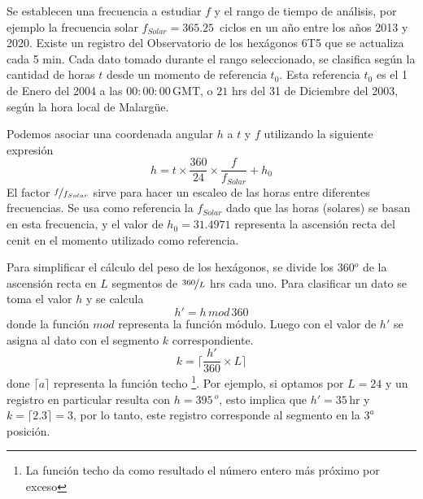         Se establecen una frecuencia a estudiar $f$ y el rango de tiempo de análisis, por ejemplo la frecuencia solar $f_{Solar}= 365.25\,$ ciclos en un año entre los años 2013 y 2020. Existe un registro del Observatorio de los hexágonos 6T5 que se actualiza cada 5 min. Cada dato tomado durante el rango seleccionado, se clasifica según la cantidad de horas $t$ desde un momento de referencia $t_0$. Esta referencia $t_0$ es el 1 de Enero del 2004 a las $00:00:00\,$GMT, o  $21$ hrs del 31 de Diciembre del 2003, según la hora local de Malargüe.

        Podemos asociar una coordenada angular $h$   a $t$  y $f$  utilizando la siguiente expresión
         \begin{equation}
          h = t \times \frac{360}{24} \times\frac{f}{f_{Solar}} + h_0
          \label{eq:h_horas} 
        \end{equation}
        El factor $\nicefrac{f}{f_{Solar}}$ sirve para hacer un escaleo de las horas entre diferentes frecuencias. Se usa como referencia la $f_{Solar}$ dado que las horas (solares) se basan en esta frecuencia, y el valor de $h_0=31.4971$ representa la ascensión recta del cenit en el momento utilizado como referencia.
        
        Para simplificar el cálculo del peso de los hexágonos, se divide los 360$^o$ de la ascensión recta en $L$ segmentos de $\nicefrac{360}{L}$ hrs cada uno. Para clasificar un dato se  toma  el valor $h$  y se calcula
        \begin{equation}
          h' = h\, mod \,360 
          \label{eq:h_primado}
        \end{equation}
        donde la función $mod$ representa la función módulo. Luego con el valor de $h'$ se asigna al dato con el segmento $k$ correspondiente.
        \begin{equation}
          k = \bigg \lceil \frac{h'}{360}\times L \bigg \rceil
        \end{equation}
        done $\lceil a \rceil$ representa la función techo \footnote{La función techo da como resultado el número entero más próximo por exceso}. Por ejemplo, si optamos por $L=24$ y un registro en particular resulta con  $h=395\,^o$, esto implica que $h'= 35\,$hr y $k=\lceil 2.3 \rceil=3$, por lo tanto, este registro corresponde al segmento en la $3^{a}$ posición.

